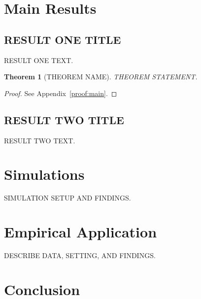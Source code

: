 \documentclass[english, 12pt, a4paper]{article}
\newtheorem{thm}{Theorem}
\begin{document}
\section{Main Results}

\subsection{RESULT ONE TITLE}

RESULT ONE TEXT.

\begin{thm}[THEOREM NAME]
    \label{thm:main}
    THEOREM STATEMENT.
\end{thm}

\begin{proof}
    See Appendix~\ref{proof:main}.
\end{proof}

\subsection{RESULT TWO TITLE}

RESULT TWO TEXT.

\section{Simulations}   %

SIMULATION SETUP AND FINDINGS.

\section{Empirical Application}   %

DESCRIBE DATA, SETTING, AND FINDINGS.

\section{Conclusion}
\end{document}
